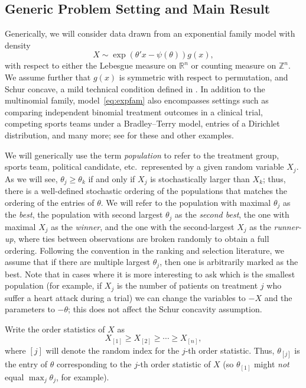 \documentclass[aos, authoryear]{imsart}
\theoremstyle{definition}
\theoremstyle{custom}
\newcommand{\RR}{\mathbb{R}}
\newcommand{\ZZ}{\mathbb{Z}}
\begin{document}
\subsection{Generic Problem Setting and Main Result}
\label{sec:probset}

Generically, we will consider data drawn from an exponential family model with density
\begin{equation}
\label{eq:expfam}
X \sim \exp\left(\theta'x - \psi\left(\theta\right)\right) g\left(x\right),
\end{equation}
with respect to either the Lebesgue measure on $\RR^n$ or counting measure on $\ZZ^n$. We assume further that $g\left(x\right)$ is symmetric with respect to permutation, and Schur concave, a mild technical condition defined in . In addition to the multinomial family, model~\eqref{eq:expfam} also encompasses settings such as comparing independent binomial treatment outcomes in a clinical trial, competing sports teams under a Bradley--Terry model, entries of a Dirichlet distribution, and many more; see  for these and other examples.

We will generically use the term {\em population} to refer to the treatment group, sports team, political candidate, etc.\ represented by a given random variable $X_j$. As we will see, $\theta_j \ge \theta_k$ if and only if $X_j$ is stochastically larger than $X_k$; thus, there is a well-defined stochastic ordering of the populations that matches the ordering of the entries of $\theta$. We will refer to the population with maximal $\theta_j$ as the {\em best}, the population with second largest $\theta_j$ as the {\em second best}, the one with maximal $X_j$ as the {\em winner}, and the one with the second-largest $X_j$ as the {\em runner-up}, where ties between observations are broken randomly to obtain a full ordering. Following the convention in the ranking and selection literature, we assume that if there are multiple largest $\theta_j$, then one is arbitrarily marked as the best. Note that in cases where it is more interesting to ask which is the smallest population (for example, if $X_j$ is the number of patients on treatment $j$ who suffer a heart attack during a trial) we can change the variables to $-X$ and the parameters to $-\theta$; this does not affect the Schur concavity assumption. 

Write the order statistics of $X$ as
$$X_{[1]} \ge X_{[2]} \ge \cdots \ge X_{[n]},$$
where $[j]$ will denote the random index for the $j$-th order statistic. Thus, $\theta_{[j]}$ is the entry of $\theta$ corresponding to the $j$-th order statistic of $X$ (so $\theta_{[1]}$ might {\em not} equal $\max_j \theta_j$, for example).
\end{document}
